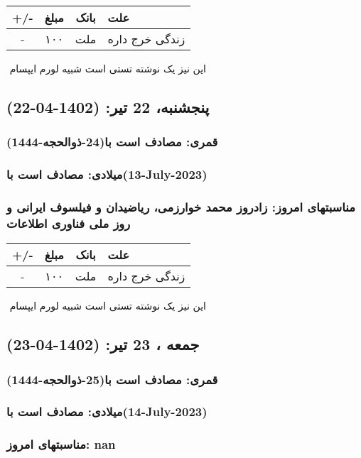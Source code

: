 \documentclass{article}
\newcommand{\rnote}[1]{\marginpar{\textcolor{color}{\StrSubstitute{\##1}{ }{\_}}}}
\newcommand{\myRow}[4]{
    #1 & #2 & #3 & #4 \\ \hline
}
\begin{document}
\begin{tabular}{ | c | c | c | p{5cm} |}
    \hline
    \myRow{ +/- }{مبلغ}{بانک}{علت}
    \myRow{-}{۱۰۰}{ملت}{زندگی خرج داره}
\end{tabular}
\newline
\newline

‌
\rnote{تست}
این نیز یک نوشته تستی است شبیه لورم ایپسام




\newpage
{}
\textcolor{color}{
\section{ پنجشنبه، 22 تیر: (1402-04-22) }
\subsubsection*{قمری: مصادف است با(24-ذوالحجه-1444)} 
\subsubsection*{میلادی: مصادف است با(13-July-2023)}
\subsubsection*{مناسبتهای امروز: زادروز محمد خوارزمی، ریاضیدان و فیلسوف ایرانی و روز ملی فناوری اطلاعات}
}


\begin{tabular}{ | c | c | c | p{5cm} |}
    \hline
    \myRow{ +/- }{مبلغ}{بانک}{علت}
    \myRow{-}{۱۰۰}{ملت}{زندگی خرج داره}
\end{tabular}
\newline
\newline

‌
\rnote{تست}
این نیز یک نوشته تستی است شبیه لورم ایپسام




\newpage
{}
\textcolor{color}{
\section{ جمعه ، 23 تیر: (1402-04-23) }
\subsubsection*{قمری: مصادف است با(25-ذوالحجه-1444)} 
\subsubsection*{میلادی: مصادف است با(14-July-2023)}
\subsubsection*{مناسبتهای امروز: nan}
}
\end{document}
